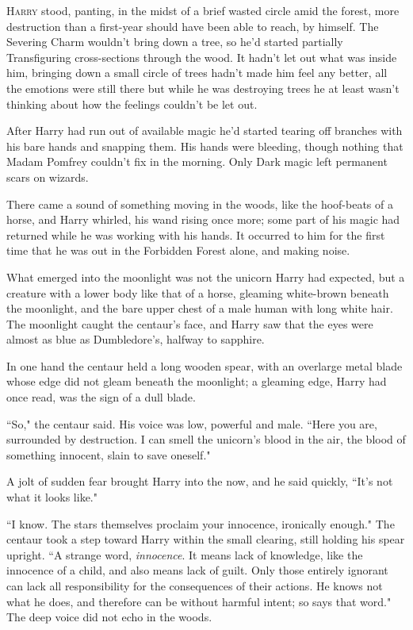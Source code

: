 
\lettrine{H}{arry} stood, panting, in the midst of a brief wasted circle amid the forest, more destruction than a first-year should have been able to reach, by himself. The Severing Charm wouldn't bring down a tree, so he'd started partially Transfiguring cross-sections through the wood. It hadn't let out what was inside him, bringing down a small circle of trees hadn't made him feel any better, all the emotions were still there but while he was destroying trees he at least wasn't thinking about how the feelings couldn't be let out.

After Harry had run out of available magic he'd started tearing off branches with his bare hands and snapping them. His hands were bleeding, though nothing that Madam Pomfrey couldn't fix in the morning. Only Dark magic left permanent scars on wizards.

There came a sound of something moving in the woods, like the hoof-beats of a horse, and Harry whirled, his wand rising once more; some part of his magic had returned while he was working with his hands. It occurred to him for the first time that he was out in the Forbidden Forest alone, and making noise.

What emerged into the moonlight was not the unicorn Harry had expected, but a creature with a lower body like that of a horse, gleaming white-brown beneath the moonlight, and the bare upper chest of a male human with long white hair. The moonlight caught the centaur's face, and Harry saw that the eyes were almost as blue as Dumbledore's, halfway to sapphire.

In one hand the centaur held a long wooden spear, with an overlarge metal blade whose edge did not gleam beneath the moonlight; a gleaming edge, Harry had once read, was the sign of a dull blade.

``So," the centaur said. His voice was low, powerful and male. ``Here you are, surrounded by destruction. I can smell the unicorn's blood in the air, the blood of something innocent, slain to save oneself."

A jolt of sudden fear brought Harry into the now, and he said quickly, ``It's not what it looks like."

``I know. The stars themselves proclaim your innocence, ironically enough." The centaur took a step toward Harry within the small clearing, still holding his spear upright. ``A strange word, \emph{innocence}. It means lack of knowledge, like the innocence of a child, and also means lack of guilt. Only those entirely ignorant can lack all responsibility for the consequences of their actions. He knows not what he does, and therefore can be without harmful intent; so says that word." The deep voice did not echo in the woods.

